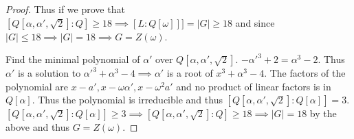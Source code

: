 \documentclass{article}
\begin{document}
\begin{proof}
    Thus if we prove that $[Q[\alpha, \alpha', \sqrt{2}] : Q] \geq 18 \implies [L: Q[\omega]]] = |G| \geq 18$ and since $|G| \leq 18 \implies |G| = 18 \implies G = Z(\omega)$.   
    
    Find the minimal polynomial of $\alpha'$ over $Q[\alpha, \alpha', \sqrt{2}]$. $-\alpha'^3 + 2 = \alpha^3 - 2$. Thus $\alpha'$ is a solution to $\alpha'^3 + \alpha^3 - 4 \implies \alpha'$ is a root of $x^3 + \alpha^3 - 4$. The factors of the polynomial are $x - a', x - \omega \alpha', x - \omega^2 a'$ and no product of linear factors is in $Q[\alpha]$. Thus the polynomial is irreducible and thus $[Q[\alpha, \alpha', \sqrt{2}] : Q[\alpha]] = 3$. $[Q[\alpha, \alpha', \sqrt{2}] : Q[\alpha]] \geq 3 \implies [Q[\alpha, \alpha', \sqrt{2}] : Q] \geq 18 \implies |G| = 18$ by the above and thus $G = Z(\omega). $                
\end{proof}
\end{document}
